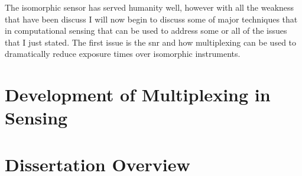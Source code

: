The isomorphic sensor has served humanity well, however with all the weakness that have been discuss I will now begin to discuss some of major techniques that in computational sensing that can be used to address some or all of the issues that I just stated. The first issue is the \gls{snr} and how multiplexing can be used to dramatically reduce exposure times over isomorphic instruments.

\section{Development of Multiplexing in Sensing}


\section{Dissertation Overview}



%  
%

